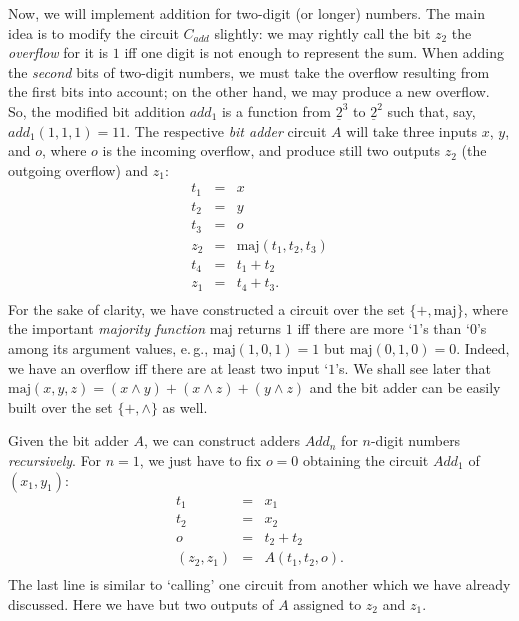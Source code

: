 \documentclass[12pt,notitlepage]{article}
\theoremstyle{plain}
\theoremstyle{definition}
\theoremstyle{plain}
\newcommand{\ul}[1]{\underline{#1}}
\newcommand{\1}{\mathbf{1}}
\newcommand{\0}{\mathbf{0}}
\begin{document}
Now, we will implement addition for two-digit (or longer) numbers. The main idea is to modify the circuit $C_{add}$ slightly: we may rightly call the bit $z_2$ the \emph{overflow} for it is $1$ iff one digit is not enough to represent the sum. When adding the \emph{second} bits of two-digit numbers, we must take the overflow resulting from the first bits into account; on the other hand, we may produce a new overflow. So, the modified bit addition $add_1$ is a function from $\ul{2}^3$ to $\ul{2}^2$ such that, say, $add_1(1, 1, 1) = 11$. The respective \emph{bit adder} circuit $A$ will take three inputs $x$, $y$, and $o$, where $o$ is the incoming overflow, and produce still two outputs $z_2$ (the outgoing overflow) and $z_1$:
$$
\begin{array}{rcl}
	t_1 &=& x\\
	t_2 &=& y\\
	t_3 &=& o\\
	z_2 &=& \mathrm{maj}(t_1, t_2, t_3)\\
	t_4 &=& t_1 + t_2\\
	z_1 &=& t_4 + t_3.\\
\end{array}
$$
For the sake of clarity, we have constructed a circuit over the set $\{{+}, {\mathrm{maj}} \}$, where the important \emph{majority function}  $\mathrm{maj}$ returns $1$ iff there are more `$1$'s than `$0$'s among its argument values, e.\,g., $\mathrm{maj}(1,0,1) = 1$ but $\mathrm{maj}(0,1,0) = 0$. Indeed, we have an overflow iff there are at least two input `$1$'s. We shall see later that $\mathrm{maj}(x,y,z) = (x \wedge y) + (x \wedge z) + (y \wedge z)$ and the bit adder can be easily built over the set $\{{+}, {\wedge}\}$ as well.

Given the bit adder $A$, we can construct adders $Add_n$ for $n$-digit numbers \emph{recursively}. For $n = 1$, we just have to fix $o = 0$ obtaining the circuit $Add_1$ of $(x_1, y_1)$:
$$
\begin{array}{rcl}
	t_1 &=& x_1\\
	t_2 &=& x_2\\
	o &=& t_2 + t_2\\
	(z_2, z_1) &=& A(t_1, t_2, o).\\
\end{array}
$$
The last line is similar to `calling' one circuit from another which we have already discussed. Here we have but two outputs of $A$ assigned to $z_2$ and $z_1$.
\end{document}

